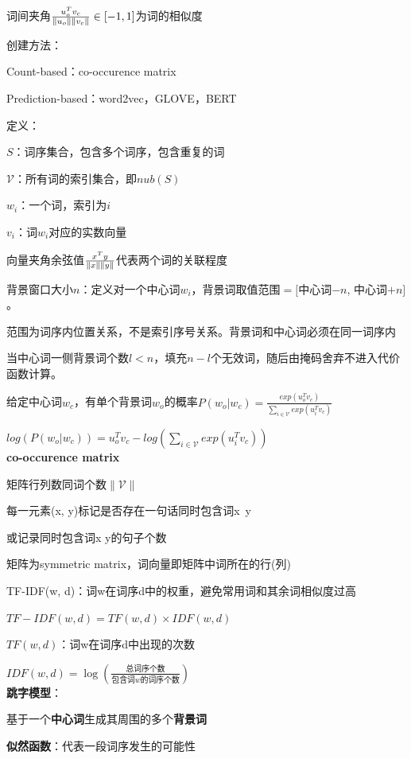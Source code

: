 \documentclass[UTF8]{ctexart}
\begin{document}
  \quad 词间夹角$\frac{u_o^Tv_c}{\|u_o\|\space\|v_c\|} \in [-1, 1]$为词的相似度

  创建方法：

  \quad Count-based：co-occurence matrix 

  \quad Prediction-based：word2vec，GLOVE，BERT

  定义：

  \quad $S$：词序集合，包含多个词序，包含重复的词

  \quad $\mathcal{V} $：所有词的索引集合，即$nub(S)$

  \quad $w_i$：一个词，索引为$i$

  \quad $v_i$：词$w_i$对应的实数向量
  
  \quad \quad 向量夹角余弦值$\frac{x^Ty}{\|x\|\space \|y\|}$代表两个词的关联程度

  \quad 背景窗口大小$n$：定义对一个中心词$w_i$，背景词取值范围$=[$中心词$-n$, 中心词$+n]$。
  
  \quad \quad 范围为词序内位置关系，不是索引序号关系。背景词和中心词必须在同一词序内

  \quad \quad 当中心词一侧背景词个数$l<n$，填充$n-l$个无效词，随后由掩码舍弃不进入代价函数计算。

  给定中心词$w_c$，有单个背景词$w_o$的概率$P(w_o | w_c) = \frac{exp(u_o^Tv_c)}{\sum_{i\in\mathcal{V} } exp(u_i^Tv_c)}$
  
  \quad $ log(P(w_o | w_c)) = u_o^Tv_c - log(\sum_{i\in\mathcal{V} } exp(u_i^Tv_c))$\\
\textbf{co-occurence matrix}

  矩阵行列数同词个数$\|\mathcal{V}\|$
  
  \quad 每一元素(x, y)标记是否存在一句话同时包含词x\ y

  \quad 或记录同时包含词x y的句子个数
  
  矩阵为symmetric matrix，词向量即矩阵中词所在的行(列)
  
  TF-IDF(w, d)：词w在词序d中的权重，避免常用词和其余词相似度过高
  
  \quad $TF-IDF(w, d) = TF(w, d) \times IDF(w, d)$
  
  \quad \quad $TF(w, d)$：词w在词序d中出现的次数
  
  \quad \quad $IDF(w, d) = \log(\frac{总词序个数}{包含词w的词序个数})$\\
\textbf{跳字模型}：
  
  基于一个\textbf{中心词}生成其周围的多个\textbf{背景词}

  \textbf{似然函数}：代表一段词序发生的可能性
\end{document}
